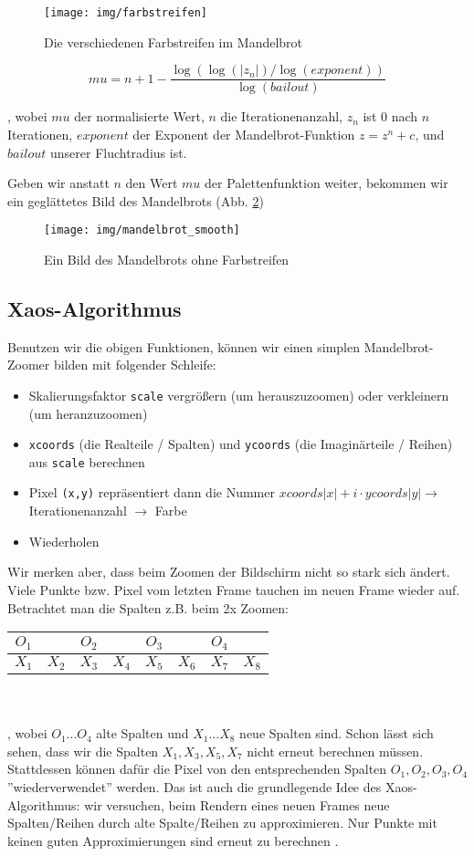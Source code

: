 \documentclass{article}
\begin{document}
\begin{figure}
\centering
\texttt{[image: img/farbstreifen]}
\caption{Die verschiedenen Farbstreifen im Mandelbrot}
\label{fig:farbstreifen}
\end{figure}
$$mu = n + 1 - \frac{\log(\log(|z_n|) / \log(exponent))}{\log(bailout)} $$

, wobei $mu$ der normalisierte Wert, $n$ die Iterationenanzahl, $z_n$ ist 0 nach $n$ Iterationen, $exponent$ der Exponent der Mandelbrot-Funktion $z = z^n + c$, und $bailout$ unserer Fluchtradius ist. \cite{linas}

Geben wir anstatt $n$ den Wert $mu$ der Palettenfunktion weiter, bekommen wir ein geglättetes Bild des Mandelbrots (Abb. \ref{fig:mandelbrot_smooth})

\begin{figure}
\centering
\texttt{[image: img/mandelbrot\_smooth]}
\caption{Ein Bild des Mandelbrots ohne Farbstreifen}
\label{fig:mandelbrot_smooth}
\end{figure}


\subsection{Xaos-Algorithmus}
Benutzen wir die obigen Funktionen, können wir einen simplen Mandelbrot-Zoomer bilden mit folgender Schleife:
\begin{itemize}
\item Skalierungsfaktor \lstinline|scale| vergrößern (um herauszuzoomen) oder verkleinern (um heranzuzoomen)
\item \lstinline|xcoords| (die Realteile / Spalten) und \lstinline|ycoords| (die Imaginärteile / Reihen) aus \lstinline|scale| berechnen
\item Pixel \lstinline|(x,y)| repräsentiert dann die Nummer $xcoords|x| + i \cdot ycoords|y| \rightarrow$  Iterationenanzahl $\rightarrow$ Farbe
\item Wiederholen
\end{itemize}
Wir merken aber, dass beim Zoomen der Bildschirm nicht so stark sich ändert. Viele Punkte bzw. Pixel vom letzten Frame tauchen im neuen Frame wieder auf. Betrachtet man die Spalten z.B. beim 2x Zoomen:
 \\ 
 
\begin{tabular}{c c c c c c c c}
$O_1$ &  &$O_2$  &  & $O_3$  &  & $O_4$ &  \\
\hline
$X_1$ & $X_2$ & $X_3$ & $X_4$ & $X_5$  & $X_6$ & $X_7$  & $X_8$  \\
\end{tabular}
 \\
 \\
, wobei $O_1... O_4$ alte Spalten und $X_1 ... X_8$ neue Spalten sind. Schon lässt sich sehen, dass wir die Spalten $X_1, X_3, X_5, X_7$ nicht erneut berechnen müssen. Stattdessen können dafür die Pixel von den entsprechenden Spalten $O_1 , O_2, O_3, O_4$ ''wiederverwendet'' werden. Das ist auch die grundlegende Idee des Xaos-Algorithmus: wir versuchen, beim Rendern eines neuen Frames neue Spalten/Reihen durch alte Spalte/Reihen zu approximieren. Nur Punkte mit keinen guten Approximierungen sind erneut zu berechnen \cite{xaos}.
\end{document}
